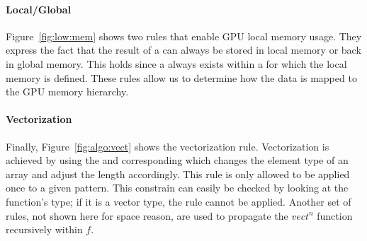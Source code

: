 \paragraph{Local/Global}
Figure~\ref{fig:low:mem} shows two rules that enable GPU local memory usage.
They express the fact that the result of a  can always be stored in local memory or back in global memory.
This holds since a  always exists within a  for which the local memory is defined.
These rules allow us to determine how the data is mapped to the GPU memory hierarchy.



\paragraph{Vectorization}
Finally, Figure~\ref{fig:algo:vect} shows the vectorization rule.
Vectorization is achieved by using the  and corresponding  which changes the element type of an array and adjust the length accordingly.
This rule is only allowed to be applied once to a given  pattern.
This constrain can easily be checked by looking at the function's type; if it is a vector type, the rule cannot be applied.
Another set of rules, not shown here for space reason, are used to propagate the $vect^n$ function recursively within $f$.

%
%



